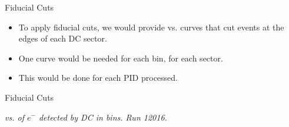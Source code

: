 \begin{frame}{Fiducial Cuts}
    \label{20.06::fiducial_cuts}

    \vspace{48pt}

    \begin{itemize}
        \item
            To apply fiducial cuts, we would provide \ef{$\phi$} vs. \ef{$\theta$} curves that cut events at the edges of each DC sector.

        \vspace{18pt}
        \item
            One curve would be needed for each  bin, for each sector.

        \vspace{18pt}
        \item
            This would be done for each PID processed.
    \end{itemize}

\end{frame}

\begin{frame}{Fiducial Cuts}
    \begin{center}
        \begin{figure}[t]
        \end{figure}
        \scriptsize{\textit{
            \ef{$\phi$} vs. \ef{$\theta$} of $e^-$ detected by DC in  bins. Run 12016.
        }}
    \end{center}

\end{frame}
